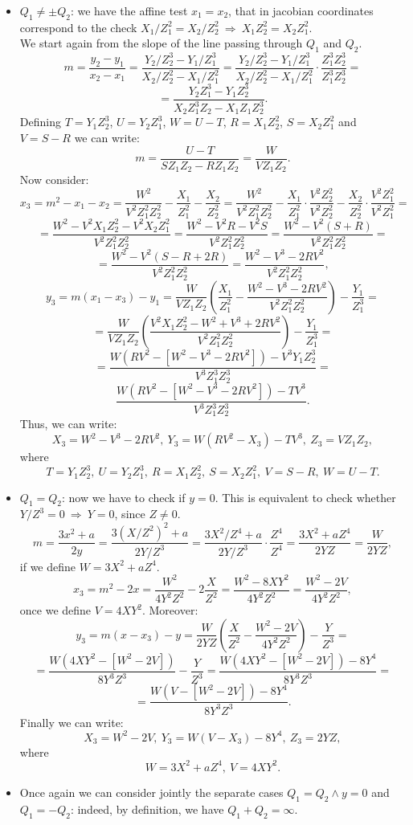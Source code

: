 \begin{itemize}
	\item $Q_1 \neq \pm Q_2$: we have the affine test $x_1 = x_2$, that in jacobian coordinates correspond to the check $X_1/Z_1^2 = X_2/Z_2^2 \ \Longrightarrow \ X_1Z_2^2 = X_2Z_1^2$. 
	\\
	We start again from the slope of the line passing through $Q_1$ and $Q_2$.
	$$m = \frac{y_2 - y_1}{x_2 - x_1} = \frac{Y_2/Z_2^3 - Y_1/Z_1^3}{X_2/Z_2^2 - X_1/Z_1^2} = \frac{Y_2/Z_2^3 - Y_1/Z_1^3}{X_2/Z_2^2 - X_1/Z_1^2} \cdot \frac{Z_1^3Z_2^3}{Z_1^3Z_2^3} =$$ $$= \frac{Y_2Z_1^3 - Y_1Z_2^3}{X_2Z_1^3Z_2 - X_1Z_1Z_2^3}.$$
	Defining $T = Y_1Z_2^3$, $U = Y_2Z_1^3$, $W = U - T$, $R = X_1Z_2^2$, $S = X_2Z_1^2$ and $V = S - R$ we can write:
	$$m = \frac{U - T}{SZ_1Z_2 - RZ_1Z_2} = \frac{W}{VZ_1Z_2}.$$
	Now consider:
	$$x_3 = m^2 - x_1 - x_2 = \frac{W^2}{V^2Z_1^2Z_2^2} - \frac{X_1}{Z_1^2} - \frac{X_2}{Z_2^2} = \frac{W^2}{V^2Z_1^2Z_2^2} - \frac{X_1}{Z_1^2}\cdot\frac{V^2Z_2^2}{V^2Z_2^2} - \frac{X_2}{Z_2^2}\cdot\frac{V^2Z_1^2}{V^2Z_1^2} = $$ $$= \frac{W^2 - V^2X_1Z_2^2 - V^2X_2Z_1^2}{V^2Z_1^2Z_2^2} = \frac{W^2 - V^2R - V^2S}{V^2Z_1^2Z_2^2} = \frac{W^2 - V^2(S + R)}{V^2Z_1^2Z_2^2} = $$ $$= \frac{W^2 - V^2(S - R + 2R)}{V^2Z_1^2Z_2^2} = \frac{W^2 - V^3 - 2RV^2}{V^2Z_1^2Z_2^2},$$
	$$y_3 = m(x_1 - x_3) - y_1 = \frac{W}{VZ_1Z_2}\left(\frac{X_1}{Z_1^2} - \frac{W^2 - V^3 - 2RV^2}{V^2Z_1^2Z_2^2}\right) - \frac{Y_1}{Z_1^3} = $$ $$= \frac{W}{VZ_1Z_2}\left(\frac{V^2X_1Z_2^2 - W^2 + V^3 + 2RV^2}{V^2Z_1^2Z_2^2}\right) - \frac{Y_1}{Z_1^3} = $$ $$= \frac{W(RV^2 - [W^2 - V^3 - 2RV^2]) - V^3Y_1Z_2^3}{V^3Z_1^3Z_2^3} = $$ $$\frac{W(RV^2 - [W^2 - V^3 - 2RV^2]) - TV^3}{V^3Z_1^3Z_2^3}.$$
	Thus, we can write:
	$$X_3 = W^2 - V^3 - 2RV^2, \ Y_3 = W(RV^2 - X_3) - TV^3, \ Z_3 = VZ_1Z_2,$$
	where
	$$T = Y_1Z_2^3, \ U = Y_2Z_1^3, \ R = X_1Z_2^2, \ S = X_2Z_1^2, \ V = S - R, \ W = U - T.$$
	\item $Q_1 = Q_2$:  now we have to check if $y = 0$. This is equivalent to check whether  $Y / Z^3 = 0 \ \Longrightarrow \ Y = 0$, since $Z \neq 0$.
	$$m = \frac{3x^2 + a}{2y} = \frac{3(X/Z^2)^2 + a}{2Y/Z^3} = \frac{3X^2/Z^4 + a}{2Y/Z^3} \cdot \frac{Z^4}{Z^4} = \frac{3X^2 + aZ^4}{2YZ} = \frac{W}{2YZ},$$
	if we define $W = 3X^2 + aZ^4$.
	$$x_3 = m^2 - 2x = \frac{W^2}{4Y^2Z^2} - 2\frac{X}{Z^2} = \frac{W^2 - 8XY^2}{4Y^2Z^2} = \frac{W^2 - 2V}{4Y^2Z^2},$$ once we define $V = 4XY^2$. Moreover:
	$$y_3 = m(x - x_3) - y = \frac{W}{2YZ}\left(\frac{X}{Z^2} - \frac{W^2 - 2V}{4Y^2Z^2}\right) - \frac{Y}{Z^3} = $$ $$= \frac{W(4XY^2 - [W^2 - 2V])}{8Y^3Z^3} - \frac{Y}{Z^3} = \frac{W(4XY^2 - [W^2 - 2V]) - 8Y^4}{8Y^3Z^3} =$$ $$= \frac{W(V - [W^2 - 2V]) - 8Y^4}{8Y^3Z^3}.$$
	Finally we can write:
	$$X_3 = W^2 - 2V, \ Y_3 = W(V - X_3) - 8Y^4, \ Z_3 = 2YZ,$$
	where
	$$W = 3X^2 + aZ^4, \ V = 4XY^2.$$
	\item Once again we can consider jointly the separate cases $Q_1 = Q_2 \wedge y = 0$ and $Q_1 = -Q_2$: indeed, by definition, we have $Q_1 + Q_2 = \infty$.
\end{itemize}
